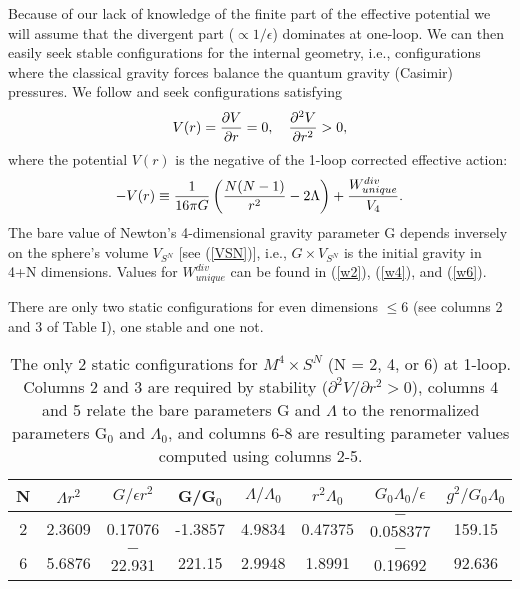 \documentclass[a4paper,aps,preprint,groupedaddress,showpacs]{revtex4}
\begin{document}
Because of our lack of knowledge of the finite part of the 
effective potential we will assume that the divergent part ($\propto 1/\epsilon$) 
dominates at one-loop. We 
can then easily seek stable configurations for the internal geometry, i.e., configurations 
where the classical gravity forces balance the quantum gravity 
(Casimir) pressures.
We follow \cite{CW} and seek configurations satisfying
$$V(r)={\partial V \over \partial r} =0, \quad {\partial^2 V \over 
\partial r^2} > 0,$$
where the potential $V(r)$ is the negative of the 1-loop corrected 
effective action:
\begin{equation} 
-V(r)\equiv {1\over 16\pi G}\left({N(N-1)\over r^2}-2\Lambda\right)+
{W_{unique}^{div}\over V_4}. 
\label{efV1}
\end{equation}
The bare value of Newton's 4-dimensional gravity parameter G depends 
inversely on the sphere's volume $V_{S^N}$ 
[see (\ref{VSN})], i.e., $G\times V_{S^N}$ is the initial gravity 
 in 4+N dimensions. 
Values for $W_{unique}^{div}$ can be found in (\ref{w2}), (\ref{w4}), 
and  (\ref{w6}).

There are only two static configurations for even dimensions $\le 6$  
(see columns 2 and 3 of Table I), one stable and one not. 

\begin{table}
\caption{The only 2 static configurations for
$M^4\times S^N$ (N = 2, 4, or 6) at 1-loop. Columns 2 and 3 are required by
stability ($\partial^2 V/\partial r^2>0$), columns 4 and 5 relate the bare parameters G and $\Lambda$ to the 
renormalized parameters G$_0$ and $\Lambda_0$, and columns 6-8 
are resulting parameter values computed using columns 2-5. }
\begin{tabular}{c|cc|cc|ccc}
\hline
N & $\Lambda r^2$ & $ G/ \epsilon r^2$  &
G/G$_0$ & $\Lambda/\Lambda_0$ & $r^2\Lambda_0$ & $G_0\Lambda_0/
\epsilon$ & $g^2/G_0\Lambda_0$\\
\hline
2 & 2.3609 & 0.17076  & -1.3857 & 4.9834 & 0.47375 & $-$0.058377 & 159.15\\
6 & 5.6876 & $-$22.931  & 221.15 & 2.9948 & 1.8991 & $-$0.19692 & 92.636\\
\hline
\end{tabular}
\end{table}
 
\end{document}
